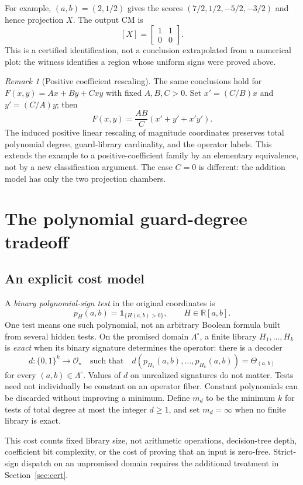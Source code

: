 \documentclass[11pt]{article}
\theoremstyle{definition}
\theoremstyle{remark}
\newtheorem{remark}[theorem]{Remark}
\newcommand{\R}{\mathbb R}
\newcommand{\B}{\{0,1\}}
\newcommand{\CM}[1]{[#1]}
\newcommand{\Oo}{\mathcal O}
\begin{document}
For example, $(a,b)=(2,1/2)$ gives the scores $(7/2,1/2,-5/2,-3/2)$ and hence projection $X$. The output CM is
\[
 \CM{X}=\begin{bmatrix}1&1\\0&0\end{bmatrix}.
\]
This is a certified identification, not a conclusion extrapolated from a numerical plot: the witness identifies a region whose uniform signs were proved above.

\begin{remark}[Positive coefficient rescaling]\label{rem:rescale}
The same conclusions hold for $F(x,y)=Ax+By+Cxy$ with fixed $A,B,C>0$. Set $x'=(C/B)x$ and $y'=(C/A)y$; then
\[
 F(x,y)=\frac{AB}{C}(x'+y'+x'y').
\]
The induced positive linear rescaling of magnitude coordinates preserves total polynomial degree, guard-library cardinality, and the operator labels. This extends the example to a positive-coefficient family by an elementary equivalence, not by a new classification argument. The case $C=0$ is different: the addition model has only the two projection chambers.
\end{remark}

\section{The polynomial guard-degree tradeoff}\label{sec:degree}

\subsection{An explicit cost model}
A \emph{binary polynomial-sign test} in the original coordinates is
\[
 p_H(a,b)=\boldsymbol 1_{\{H(a,b)>0\}},\qquad H\in\R[a,b].
\]
One test means one such polynomial, not an arbitrary Boolean formula built from several hidden tests. On the promised domain $\Lambda^\circ$, a finite library $H_1,\ldots,H_k$ is \emph{exact} when its binary signature determines the operator: there is a decoder
\[
 d:\B^k\longrightarrow\Oo_\star
 \quad\text{such that}\quad
 d(p_{H_1}(a,b),\ldots,p_{H_k}(a,b))=\Theta_{(a,b)}
\]
for every $(a,b)\in\Lambda^\circ$. Values of $d$ on unrealized signatures do not matter. Tests need not individually be constant on an operator fiber. Constant polynomials can be discarded without improving a minimum. Define $m_d$ to be the minimum $k$ for tests of total degree at most the integer $d\ge1$, and set $m_d=\infty$ when no finite library is exact.

This cost counts fixed library size, not arithmetic operations, decision-tree depth, coefficient bit complexity, or the cost of proving that an input is zero-free. Strict-sign dispatch on an unpromised domain requires the additional treatment in Section~\ref{sec:cert}.
\end{document}
